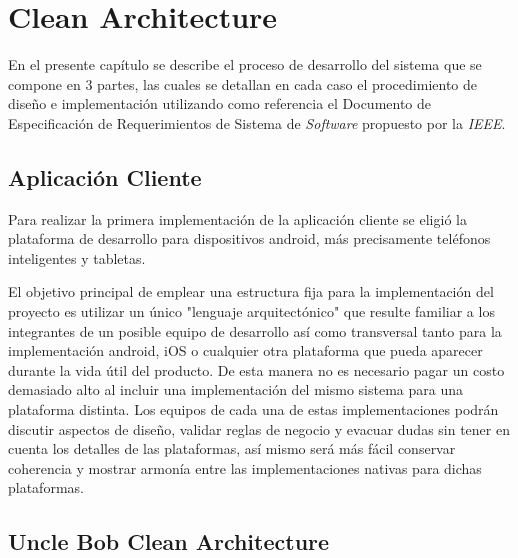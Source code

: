 
\chapter{Clean Architecture} %

En el presente capítulo se describe el proceso de desarrollo del sistema que se compone en 3 partes, las cuales se detallan en cada caso el procedimiento de diseño e implementación utilizando como referencia el Documento de Especificación de Requerimientos de Sistema de \textit{Software} propuesto por la \textit{IEEE}.\\

\label{Chapter3} %


\section{Aplicación Cliente}
Para realizar la primera implementación de la aplicación cliente se eligió la plataforma de desarrollo para dispositivos android, más precisamente teléfonos inteligentes y tabletas.

El objetivo principal de emplear una estructura fija para la implementación del proyecto es utilizar un único "lenguaje arquitectónico" que resulte familiar a los integrantes de un posible equipo de desarrollo así como transversal tanto para la implementación android, iOS o cualquier otra plataforma que pueda aparecer durante la vida útil del producto. De esta manera no es necesario pagar un costo demasiado alto al incluir una implementación del mismo sistema para una plataforma distinta. 
Los equipos de cada una de estas implementaciones podrán discutir aspectos de diseño, validar reglas de negocio y evacuar dudas sin tener en cuenta los detalles de las plataformas, así mismo será más fácil conservar coherencia y mostrar armonía entre las implementaciones nativas para dichas plataformas.

\section{Uncle Bob Clean Architecture}

